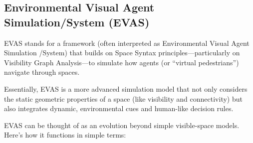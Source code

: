 \documentclass[a4paper, openany]{book}
\begin{document}
\subsection{Environmental Visual Agent Simulation/System (EVAS)}

EVAS stands for a framework (often interpreted as Environmental Visual Agent Simulation \slash System) that builds on Space Syntax principles---particularly on Visibility Graph Analysis---to simulate how agents (or ``virtual pedestrians'') navigate through spaces.

Essentially, EVAS is a more advanced simulation model that not only considers the static geometric properties of a space (like visibility and connectivity) but also integrates dynamic, environmental cues and human-like decision rules.

EVAS can be thought of as an evolution beyond simple visible-space models. Here's how it functions in simple terms:
\end{document}
